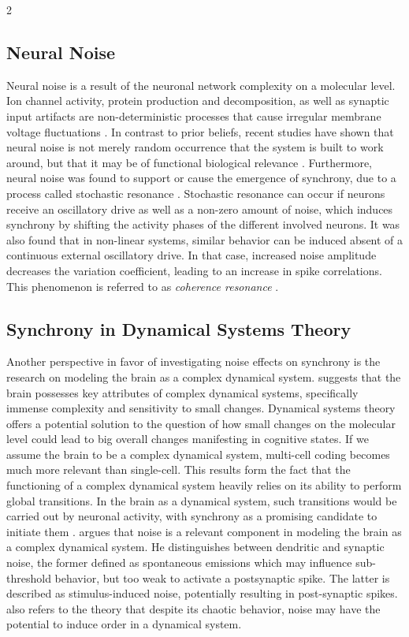 \documentclass[12pt,a4paper]{article}
\begin{document}
\begin{multicols}{2}
        \subsection{Neural Noise}
            Neural noise is a result of the neuronal network complexity on a molecular level. Ion channel activity, protein production and decomposition, as well as synaptic input artifacts are non-deterministic processes that cause irregular membrane voltage fluctuations \cite{Q}. In contrast to prior beliefs, recent studies have shown that neural noise is not merely random occurrence that the system is built to work around, but that it may be of functional biological relevance \cite{Q, P, O}. Furthermore, neural noise was found to support or cause the emergence of synchrony, due to a process called stochastic resonance \cite{B, P, Q}. Stochastic resonance can occur if neurons receive an oscillatory drive as well as a non-zero amount of noise, which induces synchrony by shifting the activity phases of the different involved neurons. It was also found that in non-linear systems, similar behavior can be induced absent of a continuous external oscillatory drive. In that case, increased noise amplitude decreases the variation coefficient, leading to an increase in spike correlations. This phenomenon is referred to as \textit{coherence resonance} \cite{O, P, Q}.
            
        \subsection{Synchrony in Dynamical Systems Theory}
            Another perspective in favor of investigating noise effects on synchrony is the research on modeling the brain as a complex dynamical system. \textcite{W} suggests that the brain possesses key attributes of complex dynamical systems, specifically immense complexity and sensitivity to small changes. Dynamical systems theory offers a potential solution to the question of how small changes on the molecular level could lead to big overall changes manifesting in cognitive states. If we assume the brain to be a complex dynamical system, multi-cell coding becomes much more relevant than single-cell. This results form the fact that the functioning of a complex dynamical system heavily relies on its ability to perform global transitions. In the brain as a dynamical system, such transitions would be carried out by neuronal activity, with synchrony as a promising candidate to initiate them \cite{W}. \textcite{Y} argues that noise is a relevant component in modeling the brain as a complex dynamical system. He distinguishes between dendritic and synaptic noise, the former defined as spontaneous emissions which may influence sub-threshold behavior, but too weak to activate a postsynaptic spike. The latter is described as stimulus-induced noise, potentially resulting in post-synaptic spikes. \textcite{Y} also refers to the theory that despite its chaotic behavior, noise may have the potential to induce order in a dynamical system.
        

\end{multicols}
\end{document}
